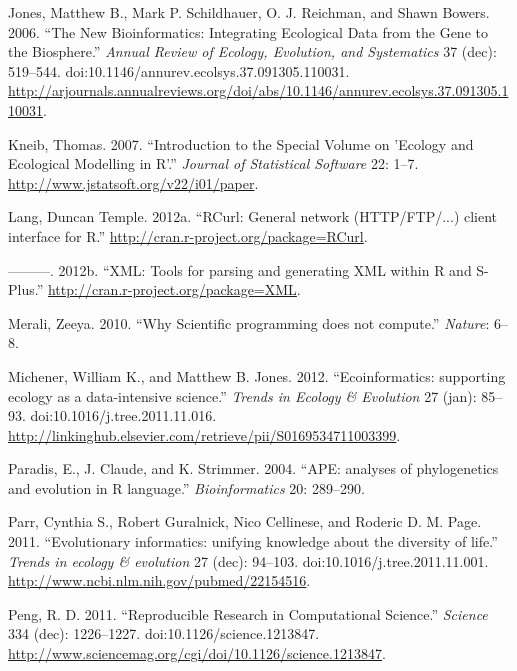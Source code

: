 \documentclass[author-year]{elsarticle} %
\begin{document}
Jones, Matthew B., Mark P. Schildhauer, O. J. Reichman, and Shawn
Bowers. 2006. ``The New Bioinformatics: Integrating Ecological Data from
the Gene to the Biosphere.'' \emph{Annual Review of Ecology, Evolution,
and Systematics} 37 (dec): 519--544.
doi:10.1146/annurev.ecolsys.37.091305.110031.
\href{http://arjournals.annualreviews.org/doi/abs/10.1146/annurev.ecolsys.37.091305.110031}{http://arjournals.annualreviews.org/doi/abs/10.1146/annurev.ecolsys.37.091305.110031}.

Kneib, Thomas. 2007. ``Introduction to the Special Volume on 'Ecology
and Ecological Modelling in R'.'' \emph{Journal of Statistical Software}
22: 1--7.
\href{http://www.jstatsoft.org/v22/i01/paper}{http://www.jstatsoft.org/v22/i01/paper}.

Lang, Duncan Temple. 2012a. ``RCurl: General network (HTTP/FTP/...)
client interface for R.''
\href{http://cran.r-project.org/package=RCurl}{http://cran.r-project.org/package=RCurl}.

---------. 2012b. ``XML: Tools for parsing and generating XML within R
and S-Plus.''
\href{http://cran.r-project.org/package=XML}{http://cran.r-project.org/package=XML}.

Merali, Zeeya. 2010. ``Why Scientific programming does not compute.''
\emph{Nature}: 6--8.

Michener, William K., and Matthew B. Jones. 2012. ``Ecoinformatics:
supporting ecology as a data-intensive science.'' \emph{Trends in
Ecology \& Evolution} 27 (jan): 85--93. doi:10.1016/j.tree.2011.11.016.
\href{http://linkinghub.elsevier.com/retrieve/pii/S0169534711003399}{http://linkinghub.elsevier.com/retrieve/pii/S0169534711003399}.

Paradis, E., J. Claude, and K. Strimmer. 2004. ``APE: analyses of
phylogenetics and evolution in R language.'' \emph{Bioinformatics} 20:
289--290.

Parr, Cynthia S., Robert Guralnick, Nico Cellinese, and Roderic D. M.
Page. 2011. ``Evolutionary informatics: unifying knowledge about the
diversity of life.'' \emph{Trends in ecology \& evolution} 27 (dec):
94--103. doi:10.1016/j.tree.2011.11.001.
\href{http://www.ncbi.nlm.nih.gov/pubmed/22154516}{http://www.ncbi.nlm.nih.gov/pubmed/22154516}.

Peng, R. D. 2011. ``Reproducible Research in Computational Science.''
\emph{Science} 334 (dec): 1226--1227. doi:10.1126/science.1213847.
\href{http://www.sciencemag.org/cgi/doi/10.1126/science.1213847}{http://www.sciencemag.org/cgi/doi/10.1126/science.1213847}.
\end{document}
